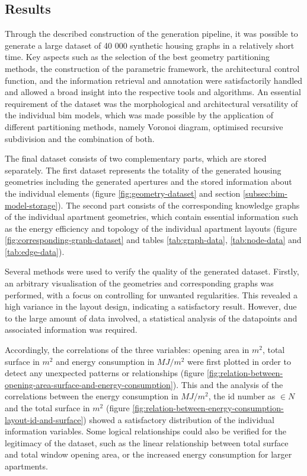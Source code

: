 \documentclass[a4paper, 12pt]{report}
\begin{document}
\subsection{Results}\label{subsec:results}

Through the described construction of the generation pipeline, it was possible to generate a large dataset of 40 000 synthetic housing graphs in a relatively short time. Key aspects such as the selection of the best geometry partitioning methods, the construction of the parametric framework, the architectural control function, and the information retrieval and annotation were satisfactorily handled and allowed a broad insight into the respective tools and algorithms. An essential requirement of the dataset was the morphological and architectural versatility of the individual \acrshort{bim} models, which was made possible by the application of different partitioning methods, namely Voronoi diagram, optimised recursive subdivision and the combination of both.

The final dataset consists of two complementary parts, which are stored separately. The first dataset represents the totality of the generated housing geometries including the generated \glspl{aperture} and the stored information about the individual elements (figure \ref{fig:geometry-dataset} and section \ref{subsec:bim-model-storage}). The second part consists of the corresponding \glspl{knowledge graph} of the individual apartment geometries, which contain essential information such as the energy efficiency and topology of the individual apartment layouts (figure \ref{fig:corresponding-graph-dataset} and tables \ref{tab:graph-data}, \ref{tab:node-data} and \ref{tab:edge-data}).

Several methods were used to verify the quality of the generated dataset. Firstly, an arbitrary visualisation of the geometries and corresponding graphs was performed, with a focus on controlling for unwanted regularities. This revealed a high variance in the layout design, indicating a satisfactory result. However, due to the large amount of data involved, a statistical analysis of the datapoints and associated information was required.

Accordingly, the correlations of the three variables: opening area in $m^2$, total surface in $m^2$ and energy consumption in $MJ/m^2$ were first plotted in order to detect any unexpected patterns or relationships (figure \ref{fig:relation-between-opening-area-surface-and-energy-consumption}). This and the analysis of the correlations between the energy consumption in $MJ/m^2$, the id number as $\in N$ and the total surface in $m^2$ (figure \ref{fig:relation-between-energy-consumption-layout-id-and-surface}) showed a satisfactory distribution of the individual information variables. Some logical relationships could also be verified for the legitimacy of the dataset, such as the linear relationship between total surface and total window opening area, or the increased energy consumption for larger apartments.
\end{document}
